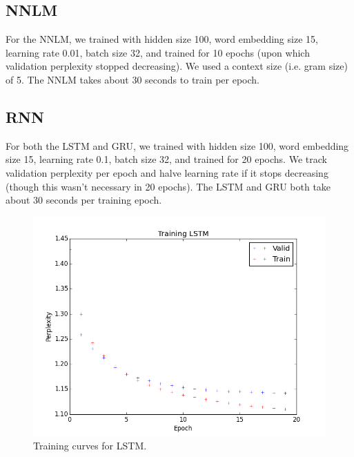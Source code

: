 \documentclass[11pt]{article}
\begin{document}
\subsection{NNLM}

For the NNLM, we trained with hidden size 100, word embedding size 15, learning rate 0.01, batch size 32, and trained for 10 epochs (upon which validation perplexity stopped decreasing). We used a context size (i.e. gram size) of 5. The NNLM takes about 30 seconds to train per epoch.

\subsection{RNN}

For both the LSTM and GRU, we trained with hidden size 100, word embedding size 15, learning rate 0.1, batch size 32, and trained for 20 epochs. We track validation perplexity per epoch and halve learning rate if it stops decreasing (though this wasn't necessary in 20 epochs). The LSTM and GRU both take about 30 seconds per training epoch.


\begin{figure}[h]
\centering
\includegraphics[scale=0.5]{train_lstm}
\caption{Training curves for LSTM.}
\end{figure}
\end{document}
